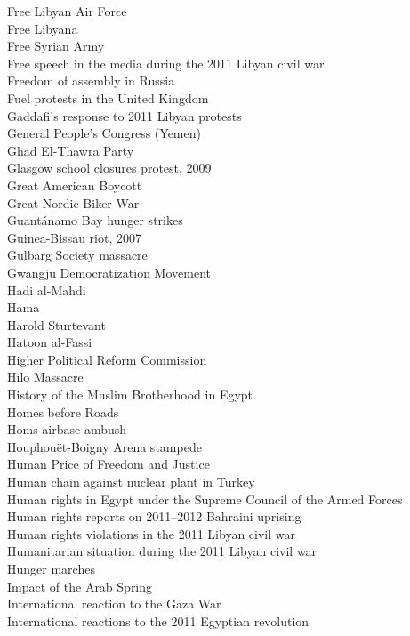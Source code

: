 Free Libyan Air Force\\
Free Libyana\\
Free Syrian Army\\
Free speech in the media during the 2011 Libyan civil war\\
Freedom of assembly in Russia\\
Fuel protests in the United Kingdom\\
Gaddafi's response to 2011 Libyan protests\\
General People's Congress (Yemen)\\
Ghad El-Thawra Party\\
Glasgow school closures protest, 2009\\
Great American Boycott\\
Great Nordic Biker War\\
Guantánamo Bay hunger strikes\\
Guinea-Bissau riot, 2007\\
Gulbarg Society massacre\\
Gwangju Democratization Movement\\
Hadi al-Mahdi\\
Hama\\
Harold Sturtevant\\
Hatoon al-Fassi\\
Higher Political Reform Commission\\
Hilo Massacre\\
History of the Muslim Brotherhood in Egypt\\
Homes before Roads\\
Homs airbase ambush\\
Houphouët-Boigny Arena stampede\\
Human Price of Freedom and Justice\\
Human chain against nuclear plant in Turkey\\
Human rights in Egypt under the Supreme Council of the Armed Forces\\
Human rights reports on 2011–2012 Bahraini uprising\\
Human rights violations in the 2011 Libyan civil war\\
Humanitarian situation during the 2011 Libyan civil war\\
Hunger marches\\
Impact of the Arab Spring\\
International reaction to the Gaza War\\
International reactions to the 2011 Egyptian revolution\\
